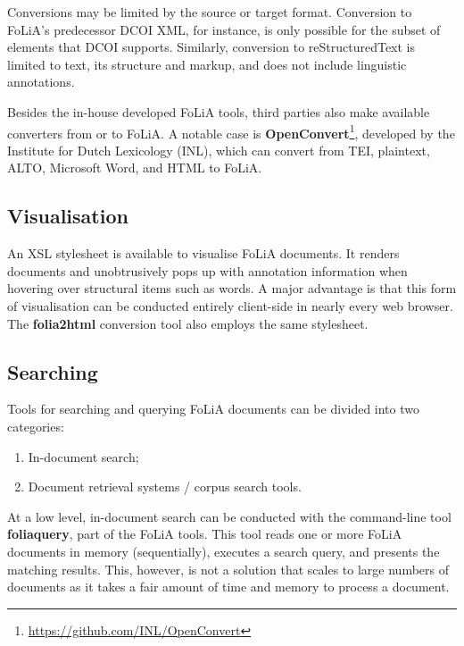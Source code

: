 \documentclass[a4paper,11pt]{article}
\begin{document}
Conversions may be limited by the source or target format. Conversion to
FoLiA's predecessor DCOI XML, for instance, is only possible for the subset of
elements that DCOI supports. Similarly, conversion to
reStructuredText is limited
to text, its structure and markup, and does not include linguistic annotations.

Besides the in-house developed FoLiA tools, third parties also make available
converters from or to FoLiA. A notable case is
\textbf{OpenConvert}\footnote{\url{https://github.com/INL/OpenConvert}},
developed by the Institute for Dutch Lexicology (INL), which can convert from
TEI, plaintext, ALTO, Microsoft Word, and HTML to FoLiA.

\subsection{Visualisation}

An XSL stylesheet is available to visualise FoLiA documents. It renders
documents and unobtrusively pops up with annotation information when hovering
over structural items such as words. A major advantage is that this form of
visualisation can be conducted entirely client-side in nearly every
web browser. The \textbf{folia2html} conversion tool also employs the same
stylesheet.

\subsection{Searching}

Tools for searching and querying FoLiA documents can be divided into two
categories:

\begin{enumerate}
 \item In-document search;
 \item Document retrieval systems / corpus search tools.
\end{enumerate}

At a low level, in-document search can be conducted with the command-line tool
\textbf{foliaquery}, part of the FoLiA tools. This tool reads one or more FoLiA
documents in memory (sequentially), executes a search query, and presents the
matching results. This, however, is not a solution that scales to large
numbers of documents as it takes a fair amount of time and memory to process a document.
\end{document}
